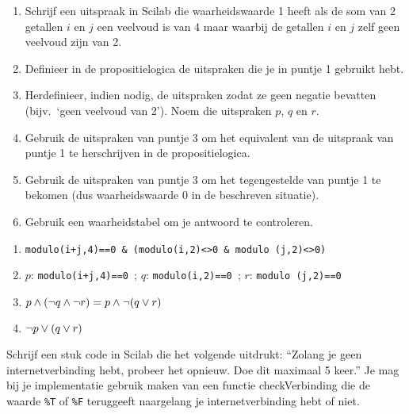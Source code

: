 \begin{oef}
\begin{enumerate}
  \item Schrijf een uitspraak in Scilab die waarheidswaarde 1 heeft als de som van 2 getallen $i$ en $j$ een veelvoud is van 4 maar waarbij de getallen $i$ en $j$ zelf geen veelvoud zijn van 2.
  \item Definieer  in de propositielogica de  uitspraken die je in puntje 1 gebruikt hebt.
  \item Herdefinieer, indien nodig, de  uitspraken zodat ze  geen negatie  bevatten (bijv.\ `geen veelvoud van 2'). Noem die uitspraken $p$, $q$ en $r$.
  \item Gebruik de  uitspraken van puntje 3 om het equivalent van de uitspraak van 
        puntje 1 te herschrijven in de  propositielogica.
  \item Gebruik de  uitspraken van puntje 3 om het tegengestelde van puntje 1 te 
        bekomen (dus waarheidswaarde 0 in de beschreven situatie).
  \item Gebruik een waarheidstabel om je antwoord te controleren.
\end{enumerate}

\begin{opl}
\begin{enumerate}
  \item \verb/modulo(i+j,4)==0 & (modulo(i,2)<>0 & modulo (j,2)<>0)/
  \item $p$: \verb/modulo(i+j,4)==0 /; $q$: \verb/modulo(i,2)==0 /; $r$: \verb/modulo (j,2)==0/
  \item $p \wedge (\neg q \wedge \neg r)=p\wedge \neg (q \vee r)$
  \item $\neg p \vee (q \vee r)$
\end{enumerate}
\end{opl}
\end{oef}

\begin{oef}
Schrijf een stuk code in Scilab die het volgende uitdrukt: ``Zolang je geen internetverbinding hebt, probeer het opnieuw. Doe dit maximaal 5 keer.''
Je mag bij je implementatie gebruik maken van een functie checkVerbinding die de waarde \verb+%T+ of \verb+%F+ teruggeeft naargelang je internetverbinding hebt of niet.
\end{oef}

